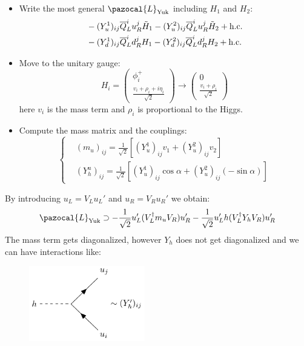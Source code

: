 \documentclass[../main.tex]{subfiles}
\begin{document}
\begin{itemize}
    \item Write the most general $\pazocal{L}_{\text{Yuk}}$ including $H_1$ and $H_2$:
    \begin{align*}
    &-(Y_u^1)_{ij}\overline{Q}_L^iu_R^j\Tilde{H}_1-(Y_u^2)_{ij}\overline{Q}_L^iu_R^j\Tilde{H}_2+\text{h.c.}\\
    &-(Y_d^1)_{ij}\overline{Q}_L^id_R^jH_1-(Y_d^2)_{ij}\overline{Q}_L^id_R^jH_2+\text{h.c.}
    \end{align*}
    \item Move to the unitary gauge:
    \[
    H_i=\left(\begin{array}{c}
    \phi_i^+\\
    \frac{v_i+\rho_i+i\eta_i}{\sqrt{2}}
    \end{array}\right)
    \xrightarrow[]{}
    \left(\begin{array}{c}
    0\\
    \frac{v_i+\rho_i}{\sqrt{2}}
    \end{array}\right)
    \]
    here $v_i$ is the mass term and $\rho_i$ is proportional to the Higgs.
    \item Compute the mass matrix and the couplings:
    \[
    \left\{
    \begin{aligned}
    &(m_u)_{ij}=\frac{1}{\sqrt{2}}\left[(Y_u^1)_{ij}v_1+(Y_u^2)_{ij}v_2\right]\\
    &(Y_h^u)_{ij}=\frac{1}{\sqrt{2}}\left[(Y_u^1)_{ij}\cos\alpha+(Y_u^2)_{ij}(-\sin\alpha)\right]
    \end{aligned}
    \right.
    \]
\end{itemize}
By introducing $u_L=V_Lu_L'$ and $u_R=V_Ru_R'$ we obtain:
\[
\pazocal{L}_{\text{Yuk}}\supset-\frac{1}{\sqrt{2}}u_L'(V_L^\dagger m_uV_R)u_R'-\frac{1}{\sqrt{2}}u_L'h(V_L^\dagger Y_hV_R)u_R'
\]
The mass term gets diagonalized, however $Y_h$ does not get diagonalized and we can have interactions like:
\begin{figure}[h]
    \centering
    \includegraphics[width=0.45\textwidth]{Images/Yh.pdf}
    \caption*{}
\end{figure}
\end{document}
